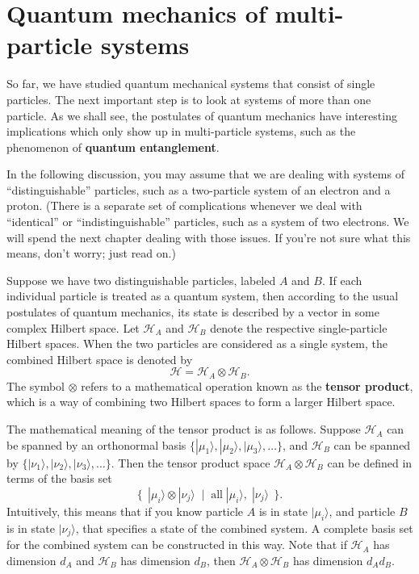 \documentclass[pra,11pt]{revtex4}
\begin{document}
\section{Quantum mechanics of multi-particle systems}

So far, we have studied quantum mechanical systems that consist of
single particles.  The next important step is to look at systems of
more than one particle.  As we shall see, the postulates of quantum
mechanics have interesting implications which only show up in
multi-particle systems, such as the phenomenon of \textbf{quantum
  entanglement}.

In the following discussion, you may assume that we are dealing with
systems of ``distinguishable'' particles, such as a two-particle
system of an electron and a proton.  (There is a separate set of
complications whenever we deal with ``identical'' or
``indistinguishable'' particles, such as a system of two electrons.
We will spend the next chapter dealing with those issues.  If you're
not sure what this means, don't worry; just read on.)

Suppose we have two distinguishable particles, labeled $A$ and $B$.
If each individual particle is treated as a quantum system, then
according to the usual postulates of quantum mechanics, its state is
described by a vector in some complex Hilbert space.  Let
$\mathscr{H}_A$ and $\mathscr{H}_B$ denote the respective
single-particle Hilbert spaces.  When the two particles are considered
as a single system, the combined Hilbert space is denoted by
$$\mathscr{H} = \mathscr{H}_A\otimes \mathscr{H}_B.$$
The symbol $\otimes$ refers to a mathematical operation known as the
\textbf{tensor product}, which is a way of combining two Hilbert
spaces to form a larger Hilbert space.

The mathematical meaning of the tensor product is as follows.  Suppose
$\mathscr{H}_A$ can be spanned by an orthonormal basis
$\{|\mu_1\rangle, |\mu_2\rangle, |\mu_3\rangle, \dots\}$, and
$\mathscr{H}_B$ can be spanned by $\{|\nu_1\rangle, |\nu_2\rangle,
|\nu_3\rangle, \dots\}$.  Then the tensor product space $\mathscr{H}_A
\otimes \mathscr{H}_B$ can be defined in terms of the basis set
$$\Big\{\;\,|\mu_i\rangle\otimes|\nu_j\rangle \;\;  \Big| \;\; \textrm{all}\;|\mu_i\rangle,\; |\nu_j\rangle \;\,\Big\}.$$
Intuitively, this means that if you know particle $A$ is in state
$|\mu_i\rangle$, and particle $B$ is in state $|\nu_j\rangle$, that
specifies a state of the combined system.  A complete basis set for
the combined system can be constructed in this way.  Note that if
$\mathscr{H}_A$ has dimension $d_A$ and $\mathscr{H}_B$ has dimension
$d_B$, then $\mathscr{H}_A \otimes \mathscr{H}_B$ has dimension $d_A
d_B$.
\end{document}
